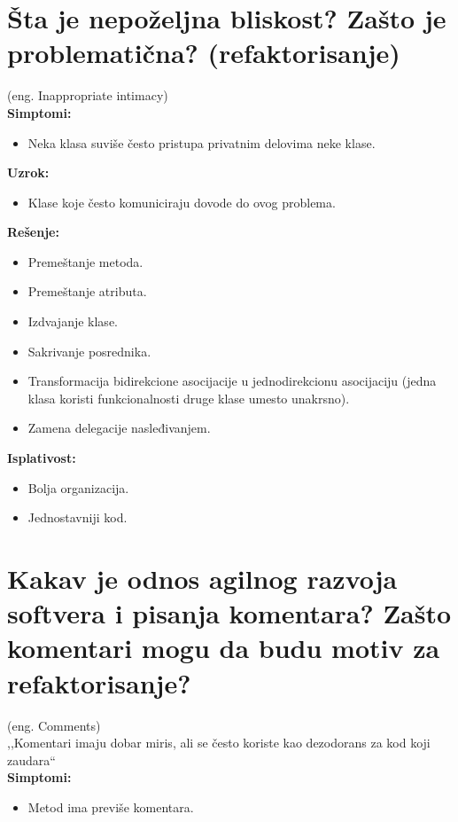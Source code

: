 \documentclass[a4paper]{article}
\begin{document}
\section{Šta je nepoželjna bliskost? Zašto je problematična? (refaktorisanje)}
  (eng. Inappropriate intimacy)\\
  \textbf{Simptomi:}
  \begin{itemize}
    \item Neka klasa suviše često pristupa privatnim delovima neke klase.
  \end{itemize}

  \noindent \textbf{Uzrok:} 
  \begin{itemize}
    \item Klase koje često komuniciraju dovode do ovog problema.
  \end{itemize}

  \noindent \textbf{Rešenje:} 
  \begin{itemize}
    \item Premeštanje metoda.
    \item Premeštanje atributa.
    \item Izdvajanje klase.
    \item Sakrivanje posrednika.
    \item Transformacija bidirekcione asocijacije u jednodirekcionu asocijaciju (jedna
          klasa koristi funkcionalnosti druge klase umesto unakrsno).
    \item Zamena delegacije nasleđivanjem.
  \end{itemize}

  \noindent \textbf{Isplativost:} 
  \begin{itemize}
    \item Bolja organizacija.
    \item Jednostavniji kod.
  \end{itemize}  

\section{Kakav je odnos agilnog razvoja softvera i pisanja komentara? 
         Zašto komentari mogu da budu motiv za refaktorisanje?}
  (eng. Comments)\\
  ,,Komentari imaju dobar miris, ali se često koriste
    kao dezodorans za kod koji zaudara``\\
  \textbf{Simptomi:}
  \begin{itemize}
    \item Metod ima previše komentara.
  \end{itemize}
\end{document}
